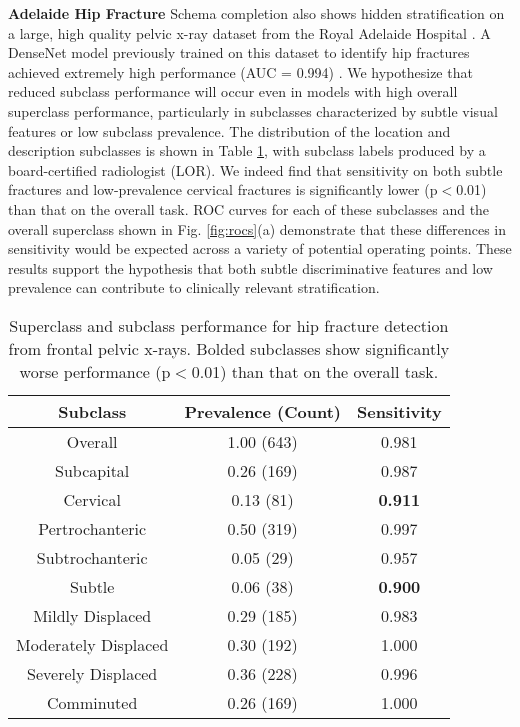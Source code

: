 \documentclass[sigconf]{acmart}
\begin{document}
\textbf{Adelaide Hip Fracture} Schema completion also shows hidden stratification on a large, high quality pelvic x-ray dataset from the Royal Adelaide Hospital \citep{Gale_W_Oakden-Rayner_L_Carneiro_G_Bradley_AP_Palmer_LJ2017-tl}.
 A DenseNet model previously trained on this dataset to identify hip fractures achieved extremely high performance (AUC = 0.994) \citep{Gale_W_Oakden-Rayner_L_Carneiro_G_Bradley_AP_Palmer_LJ2017-tl}. 
  We hypothesize that reduced subclass performance will occur even in models with high overall superclass performance, particularly in subclasses characterized by subtle visual features or low subclass prevalence.  
 The distribution of the location and description subclasses is shown in Table \ref{tab:hip1}, with subclass labels produced by a board-certified radiologist (LOR).  
 We indeed find that sensitivity on both subtle fractures and low-prevalence cervical fractures is significantly lower (p$<$0.01) than that on the overall task. 
ROC curves for each of these subclasses and the overall superclass shown in Fig. \ref{fig:rocs}(a) demonstrate that these differences in sensitivity would be expected across a variety of potential operating points. 
These results support the hypothesis that both subtle discriminative features and low prevalence can contribute to clinically relevant stratification. 
 
\begin{table}[htb!]
\centering
\begin{tabular}{ccc}
\toprule
 Subclass & Prevalence (Count) & Sensitivity \\
 \toprule
 Overall & 1.00 (643) & 0.981  \\
 Subcapital & 0.26 (169) & 0.987   \\
 Cervical & 0.13 (81) & \textbf{0.911}\\
 Pertrochanteric & 0.50 (319)  & 0.997\\
 Subtrochanteric & 0.05 (29) & 0.957 \\
 Subtle & 0.06 (38) & \textbf{0.900}\\
 Mildly Displaced & 0.29 (185) & 0.983\\
 Moderately Displaced & 0.30 (192) & 1.000\\
 Severely Displaced & 0.36 (228) & 0.996\\
 Comminuted & 0.26 (169) & 1.000 \\ 
 \toprule
\end{tabular}
\caption{Superclass and subclass performance for hip fracture detection from frontal pelvic x-rays. Bolded subclasses show significantly worse performance (p$<$0.01) than that on the overall task.}
\label{tab:hip1}
\end{table}
\end{document}
